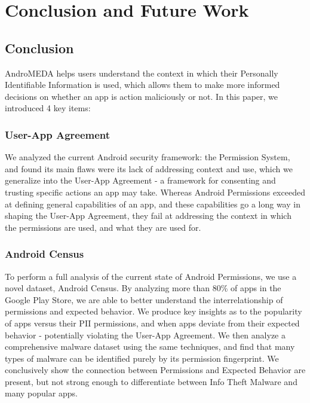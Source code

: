 \chapter{Conclusion and Future Work}
\label{sec:conclusion}
\section{Conclusion}
AndroMEDA helps users understand the context in which their Personally Identifiable Information is used, which allows them to make more informed decisions on whether an app is action maliciously or not. In this paper, we introduced 4 key items:

\subsection{User-App Agreement}

We analyzed the current Android security framework: the Permission System, and found its main flaws were its lack of addressing context and use, which we generalize into the User-App Agreement - a framework for consenting and trusting specific actions an app may take. Whereas Android Permissions exceeded at defining general capabilities of an app, and these capabilities go a long way in shaping the User-App Agreement, they fail at addressing the context in which the permissions are used, and what they are used for.

\subsection{Android Census}
To perform a full analysis of the current state of Android Permissions, we use a novel dataset, Android Census. By analyzing more than 80\% of apps in the Google Play Store, we are able to better understand the interrelationship of permissions and expected behavior. We produce key insights as to the popularity of apps versus their PII permissions, and when apps deviate from their expected behavior - potentially violating the User-App Agreement. We then analyze a comprehensive malware dataset using the same techniques, and find that many types of malware can be identified purely by its permission fingerprint. We conclusively show the connection between Permissions and Expected Behavior are present, but not strong enough to differentiate between Info Theft Malware and many popular apps.

